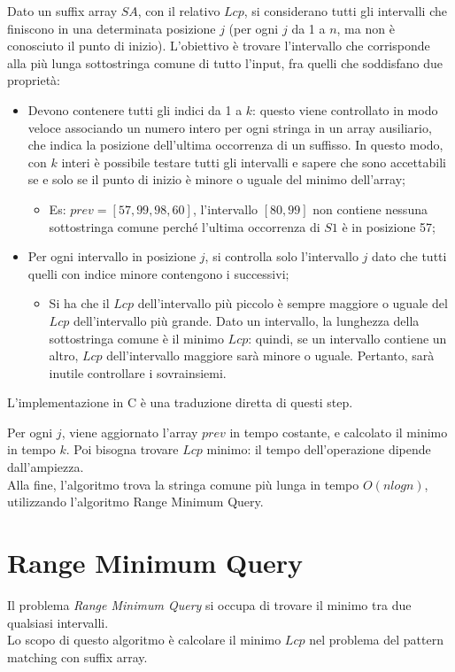 Dato un suffix array $SA$, con il relativo $Lcp$, si considerano tutti gli intervalli che finiscono in una determinata posizione $j$ (per ogni $j$ da 1 a $n$, ma non è conosciuto il punto di inizio). L'obiettivo è trovare l'intervallo che corrisponde alla più lunga sottostringa comune di tutto l'input, fra quelli che soddisfano due proprietà:
\begin{itemize}
	\item Devono contenere tutti gli indici da 1 a $k$: questo viene controllato in modo veloce associando un numero intero per ogni stringa in un array ausiliario, che indica la posizione dell'ultima occorrenza di un suffisso. In questo modo, con $k$ interi è possibile testare tutti gli intervalli e sapere che sono accettabili se e solo se il punto di inizio è minore o uguale del minimo dell'array;
	\begin{itemize}
		\item Es: $prev = [57, 99, 98, 60]$, l'intervallo $[80, 99]$ non contiene nessuna sottostringa comune perché l'ultima occorrenza di $S1$ è in posizione 57;
	\end{itemize}
	\item Per ogni intervallo in posizione $j$, si controlla solo l'intervallo $j$ dato che tutti quelli con indice minore contengono i successivi;
	\begin{itemize}
			\item Si ha che il $Lcp$ dell'intervallo più piccolo è sempre maggiore o uguale del $Lcp$ dell'intervallo più grande. Dato un intervallo, la lunghezza della sottostringa comune è il minimo $Lcp$: quindi, se un intervallo contiene un altro, $Lcp$ dell'intervallo maggiore sarà minore o uguale. Pertanto, sarà inutile controllare i sovrainsiemi.
	\end{itemize}
\end{itemize}
L'implementazione in C è una traduzione diretta di questi step. 

Per ogni $j$, viene aggiornato l'array $prev$ in tempo costante, e calcolato il minimo in tempo $k$. Poi bisogna trovare $Lcp$ minimo: il tempo dell'operazione dipende dall'ampiezza. \\
Alla fine, l'algoritmo trova la stringa comune più lunga in tempo $O(nlogn)$, utilizzando l'algoritmo Range Minimum Query.

\section{Range Minimum Query}
Il problema \textit{Range Minimum Query} si occupa di trovare il minimo tra due qualsiasi intervalli. \\
Lo scopo di questo algoritmo è calcolare il minimo $Lcp$ nel problema del pattern matching con suffix array.

